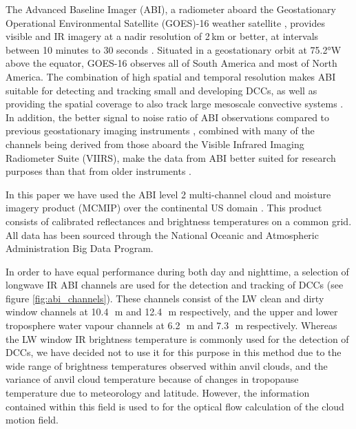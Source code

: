 The Advanced Baseline Imager (ABI), a radiometer aboard the Geostationary Operational Environmental Satellite (GOES)-16 weather satellite \citep{schmit_closer_2016}, provides visible and IR imagery at a nadir resolution of 2\,\unit{km} or better, at intervals between 10 minutes to 30 seconds \citep{schmit_chapter_2020}.
Situated in a geostationary orbit at 75.2°W above the equator, GOES-16 observes all of South America and most of North America.
The combination of high spatial and temporal resolution makes ABI suitable for detecting and tracking small and developing DCCs, as well as providing the spatial coverage to also track large mesoscale convective systems \citep{heikenfeld_tobac_2019}.
In addition, the better signal to noise ratio of ABI observations compared to previous geostationary imaging instruments \citep{iacovazzi_goes-16_2020}, combined with many of the channels being derived from those aboard the Visible Infrared Imaging Radiometer Suite (VIIRS), make the data from ABI better suited for research purposes than that from older instruments \citep{heidinger_chapter_2020}.

In this paper we have used the ABI level 2 multi-channel cloud and moisture imagery product (MCMIP) over the continental US domain \citep{schmit_chapter_2020}.
This product consists of calibrated reflectances and brightness temperatures on a common grid.
All data has been sourced through the National Oceanic and Atmospheric Administration Big Data Program.

In order to have equal performance during both day and nighttime, a selection of longwave IR ABI channels are used for the detection and tracking of DCCs (see figure \ref{fig:abi_channels}). 
These channels consist of the LW clean and dirty window channels at 10.4\,\unit{\mu m} and 12.4\,\unit{\mu m} respectively, and the upper and lower troposphere water vapour channels at 6.2\,\unit{\mu m} and 7.3\,\unit{\mu m} respectively.
Whereas the LW window IR brightness temperature is commonly used for the detection of DCCs, we have decided not to use it for this purpose in this method due to the wide range of brightness temperatures observed within anvil clouds, and the variance of anvil cloud temperature because of changes in tropopause temperature due to meteorology and latitude.
However, the information contained within this field is used to for the optical flow calculation of the cloud motion field.

